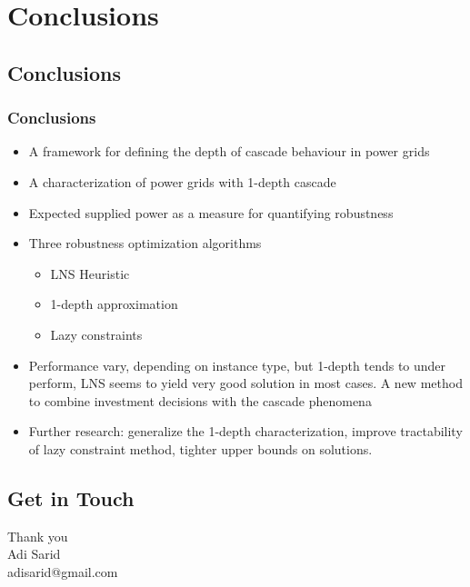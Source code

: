 \documentclass{beamer}
\begin{document}
\section{Conclusions}
\subsection{Conclusions}
\begin{frame}
\frametitle{Conclusions}
\begin{itemize}
  \item A framework for defining the depth of cascade behaviour in power grids
	\item A characterization of power grids with 1-depth cascade
	\item Expected supplied power as a measure for quantifying robustness
	\item Three robustness optimization algorithms
	\begin{itemize}
		\item LNS Heuristic
		\item 1-depth approximation
		\item Lazy constraints
	\end{itemize}
	\item Performance vary, depending on instance type, but 1-depth tends to under perform, LNS seems to yield very good solution in most cases.
	A new method to combine investment decisions with the cascade phenomena
	\item Further research: generalize the 1-depth characterization, improve tractability of lazy constraint method, tighter upper bounds on solutions.
\end{itemize}
\end{frame}

\subsection{Get in Touch}
\begin{frame}
\LARGE Thank you\\
\vspace{2.5cm}
\normalsize
Adi Sarid\\
adisarid@gmail.com
\end{frame}
\end{document}
